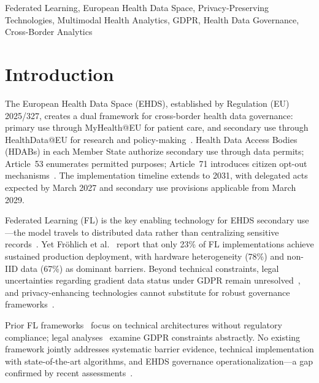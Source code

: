 \documentclass[conference]{IEEEtran}
\begin{document}
\begin{IEEEkeywords}
Federated Learning, European Health Data Space, Privacy-Preserving Technologies, Multimodal Health Analytics, GDPR, Health Data Governance, Cross-Border Analytics
\end{IEEEkeywords}

\section{Introduction}
\label{sec:introduction}

The European Health Data Space (EHDS), established by Regulation (EU) 2025/327, creates a dual framework for cross-border health data governance: primary use through MyHealth@EU for patient care, and secondary use through HealthData@EU for research and policy-making~\cite{eu2025ehds}. Health Data Access Bodies (HDABs) in each Member State authorize secondary use through data permits; Article~53 enumerates permitted purposes; Article~71 introduces citizen opt-out mechanisms~\cite{staunton2024ethical}. The implementation timeline extends to 2031, with delegated acts expected by March 2027 and secondary use provisions applicable from March 2029.

Federated Learning (FL) is the key enabling technology for EHDS secondary use---the model travels to distributed data rather than centralizing sensitive records~\cite{mcmahan2017communication, kairouz2021advances}. Yet Fr\"ohlich et al.~\cite{frohlich2025reality} report that only 23\% of FL implementations achieve sustained production deployment, with hardware heterogeneity (78\%) and non-IID data (67\%) as dominant barriers. Beyond technical constraints, legal uncertainties regarding gradient data status under GDPR remain unresolved~\cite{quinn2024gdpr}, and privacy-enhancing technologies cannot substitute for robust governance frameworks~\cite{vandrumpt2025pets}.

Prior FL frameworks~\cite{rieke2020future, beutel2023flower, nvflare2023} focus on technical architectures without regulatory compliance; legal analyses~\cite{quinn2024gdpr, staunton2024ethical} examine GDPR constraints abstractly. No existing framework jointly addresses systematic barrier evidence, technical implementation with state-of-the-art algorithms, and EHDS governance operationalization---a gap confirmed by recent assessments~\cite{chaverodiez2026fair, teo2024systematic}.
\end{document}
